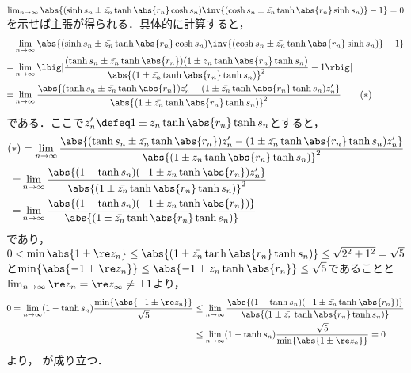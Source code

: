 \begin{ncalcof}
  
  $\lim_{n\to \infty}\abs{(\sinh s_n \pm \bar{z_n} \tanh \abs{r_n} \cosh s_n)\inv{(\cosh s_n \pm \bar{z_n} \tanh \abs{r_n} \sinh s_n) } - 1} = 0$を示せば主張が得られる．具体的に計算すると，
  \begin{align}
    &\lim_{n\to \infty}\abs{(\sinh s_n \pm \bar{z_n} \tanh \abs{r_n} \cosh s_n)\inv{(\cosh s_n \pm \bar{z_n} \tanh \abs{r_n} \sinh s_n) } - 1}\notag \\
    = & \lim_{n\to \infty}\lbig|\frac{(\tanh s_n\pm \bar{z_n}\tanh \abs{r_n})(1 \pm z_n \tanh\abs{r_n}\tanh s_n )}{\abs{(1 \pm \bar{z_n} \tanh\abs{r_n}\tanh s_n )}^2} - 1 \rbig|\notag \\    
    = & \lim_{n\to \infty}\frac{\abs{(\tanh s_n\pm \bar{z_n}\tanh \abs{r_n})z_n' - (1 \pm \bar{z_n} \tanh\abs{r_n}\tanh s_n )z_n' }}{\abs{(1 \pm \bar{z_n} \tanh\abs{r_n}\tanh s_n )}^2}\label{eq:ast} \tag{$\ast$}
  \end{align}
  である．ここで$ z_n'\defeq 1 \pm z_n\tanh\abs{r_n}\tanh s_n$とすると，
  \begin{align*}
    (\ast) &= \lim_{n\to \infty}\frac{\abs{(\tanh s_n\pm \bar{z_n}\tanh \abs{r_n})z_n' - (1 \pm \bar{z_n} \tanh\abs{r_n}\tanh s_n )z_n' }}{\abs{(1 \pm \bar{z_n} \tanh\abs{r_n}\tanh s_n )}^2}\\
    = & \lim_{n\to \infty}\frac{\abs{(1-\tanh s_n)(-1\pm \bar{z_n}\tanh \abs{r_n} )z_n'}}{\abs{(1 \pm \bar{z_n} \tanh\abs{r_n}\tanh s_n )}^2} \\
    = & \lim_{n\to \infty}\frac{\abs{(1-\tanh s_n)(-1\pm \bar{z_n}\tanh \abs{r_n} )}}{\abs{(1 \pm \bar{z_n} \tanh\abs{r_n}\tanh s_n )}} 
  \end{align*}
  であり，
  $0 < \min{\abs{1\pm \re z_n}}\leq  \abs{(1 \pm \bar{z_n} \tanh\abs{r_n}\tanh s_n )}\leq \sqrt{2^2 + 1^2} = \sqrt{5} $と$\min\{\abs{-1\pm \re z_n } \}  \leq \abs{-1\pm\bar{z_n}\tanh \abs{r_n} } \leq \sqrt{5} $であることと$\lim_{n\to \infty} \re z_n = \re z_{\infty} \neq \pm 1$より，
    \begin{align*}
      0 = \lim_{n\to \infty}(1-\tanh s_n)\frac{\min\{\abs{-1\pm \re z_n} \}}{\sqrt{5}}  &\leq \lim_{n\to \infty}\frac{\abs{(1-\tanh s_n)(-1\pm \bar{z_n}\tanh \abs{r_n} )}}{\abs{(1 \pm \bar{z_n} \tanh\abs{r_n}\tanh s_n )}}\\
      &\leq \lim_{n\to \infty}(1-\tanh s_n)\frac{\sqrt{5}}{\min\{\abs{1\pm \re z_n} \}} = 0
    \end{align*}
    より， が成り立つ．
\end{ncalcof}


